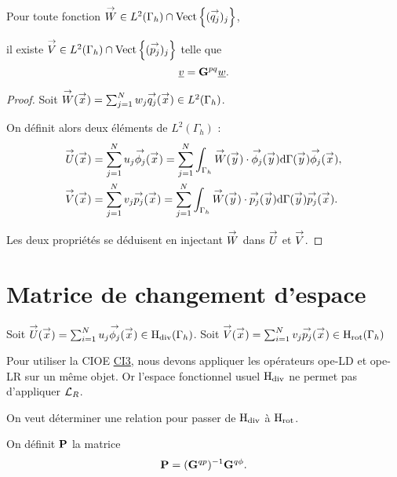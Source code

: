   \begin{prop}
    Pour toute fonction \(\vect{W} \in L^2(\Gamma_h)\cap\Vect{(\qj)_j}\),

    il existe \(\vect{V} \in L^2(\Gamma_h) \cap \Vect{(\pj)_j} \) telle que
    \begin{equation*}
      \comp{v} = \mG{p}{q}\comp{w}.
    \end{equation*}
  \end{prop}

  \begin{proof}
    Soit  \(\vect{W}(\vx) = \sum_{j=1}^N w_j \qj(\vx) \in L^2(\Gamma_h)\).

    On définit alors deux éléments de \(L^2(\Gamma_h)\) :
    \begin{align*}
      \vect{U}(\vx) &= \sum_{j=1}^N u_j \phij(\vx) = \sum_{j=1}^N \int_{\Gamma_h}\vect{W}(\vy)\cdot\phij(\vy)\dd{\Gamma}(\vy) \phij(\vx),
      \\
      \vect{V}(\vx) &= \sum_{j=1}^N v_j \pj(\vx) = \sum_{j=1}^N \int_{\Gamma_h}\vect{W}(\vy)\cdot\pj(\vy)\dd{\Gamma}(\vy) \pj(\vx).
    \end{align*}

    Les deux propriétés se déduisent en injectant \(\vect{W}\) dans \(\vect{U}\) et \(\vect{V}\).
  \end{proof}




\section{Matrice de changement d'espace}

  Soit \(\vect{U}(\vx) = \sum_{i=1}^N u_j \phij(\vx) \in \Hdiv(\Gamma_h)\).
  Soit \(\vect{V}(\vx) = \sum_{i=1}^N v_j \pj(\vx) \in \Hrot(\Gamma_h)\)  

  Pour utiliser la CIOE \hyperlink{ci3}{CI3}, nous devons appliquer les opérateurs \gls{ope-LD} et \gls{ope-LR} sur un même objet. Or l'espace fonctionnel usuel \(\Hdiv\) ne permet pas d'appliquer \(\LR\). 

  On veut déterminer une relation pour passer de \(\Hdiv\) à \(\Hrot\).

  \begin{defn}On définit \(\mPP\) la matrice
  \label{def:eq_int:matrice_changment_mP}
    \begin{equation*}
      \mPP = (\mG{q}{p})^{-1}\mG{q}{\phi}.
    \end{equation*}
  \end{defn}


